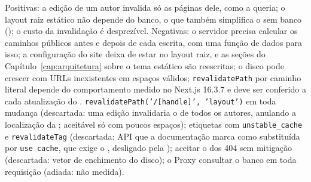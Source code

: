 {Positivas: a edição de um autor invalida só as páginas dele, como a  queria; o layout raiz estático não depende do banco, o que também simplifica o  sem banco (); o custo da invalidação é desprezível. Negativas: o servidor precisa calcular os caminhos públicos antes e depois de cada escrita, com uma função de dados para isso; a configuração do site deixa de estar no layout raiz, e as seções do Capítulo~\ref{cap:arquitetura} sobre o tema estático são reescritas; o disco pode crescer com URLs inexistentes em espaços válidos; \texttt{revalidatePath} por caminho literal depende do comportamento medido no Next.js 16.3.7 e deve ser conferido a cada atualização do .}
{\texttt{revalidatePath('/[handle]', 'layout')} em toda mudança (descartada: uma edição invalidaria o  de todos os autores, anulando a localização da ; aceitável só com poucos espaços); etiquetas com \texttt{unstable\_cache} e \texttt{revalidateTag} (descartada: API que a documentação marca como substituída por \texttt{use cache}, que exige o , desligado pela ); aceitar o  dos 404 sem mitigação (descartada: vetor de enchimento do disco); o Proxy consultar o banco em toda requisição (adiada: não medida).}

